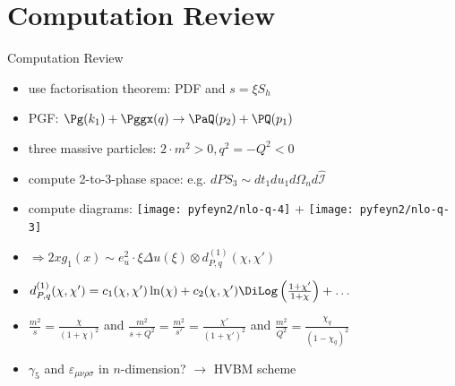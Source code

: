 \section{Computation Review}
\begin{frame}{Computation Review}
\begin{itemize}
\item use factorisation theorem: PDF and $s=\xi S_h$
\item PGF: $\Pg(k_1) + \Pggx(q) \to \PaQ(p_2) + \PQ(p_1)$
\item three massive particles: $2\cdot m^2>0,q^2=-Q^2<0$
\item<2-> compute 2-to-3-phase space: e.g. $dPS_3 \sim dt_1du_1d\Omega_nd\hat{\mathcal{I}}$
\item<2-> compute diagrams: \texttt{[image: pyfeyn2/nlo-q-4]} + \texttt{[image: pyfeyn2/nlo-q-3]}
\item<3-> $\Rightarrow 2xg_1(x) \sim e_u^2\cdot \xi\Delta u(\xi) \otimes d_{P,q}^{(1)}(\chi,\chi')$
\item<3-> $d_{P,q}^{(1)}(\chi,\chi') = c_1(\chi,\chi')\ln(\chi) + c_2(\chi,\chi')\DiLog\left(\frac{1+\chi'}{1+\chi}\right)+\ldots$ \checkmark
\item<3-> $\frac{m^2}{s} = \frac{\chi}{(1+\chi)^2}$ and $\frac{m^2}{s+Q^2} = \frac{m^2}{s'} = \frac{\chi'}{(1+\chi')^2}$ and $\frac{m^2}{Q^2} = \frac{\chi_q}{(1-\chi_q)^2}$
\item<4-> $\gamma_5$ and $\varepsilon_{\mu\nu\rho\sigma}$ in $n$-dimension? $\to$ HVBM scheme
\end{itemize}
\end{frame}


